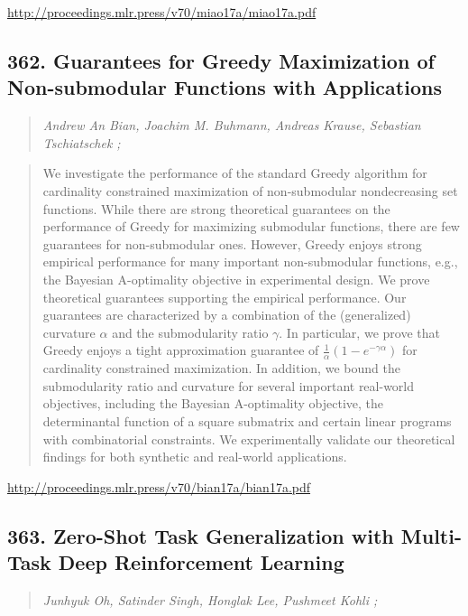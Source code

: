 \documentclass{article}
\begin{document}
\href{http://proceedings.mlr.press/v70/miao17a/miao17a.pdf}{http://proceedings.mlr.press/v70/miao17a/miao17a.pdf}

\subsection{362. Guarantees for Greedy Maximization of Non-submodular Functions with Applications}

\begin{quote}
\footnotesize{\textit{Andrew An Bian, Joachim M. Buhmann, Andreas Krause, Sebastian Tschiatschek ;}}
\end{quote}

\begin{quote}
    We investigate the performance of the standard Greedy algorithm for cardinality constrained maximization of non-submodular nondecreasing set functions. While there are strong theoretical guarantees on the performance of Greedy for maximizing submodular functions, there are few guarantees for non-submodular ones. However, Greedy enjoys strong empirical performance for many important non-submodular functions, e.g., the Bayesian A-optimality objective in experimental design. We prove theoretical guarantees supporting the empirical performance. Our guarantees are characterized by a combination of the (generalized) curvature $\alpha$ and the submodularity ratio $\gamma$. In particular, we prove that Greedy enjoys a tight approximation guarantee of $\frac{1}{\alpha}(1- e^{-\gamma\alpha})$ for cardinality constrained maximization. In addition, we bound the submodularity ratio and curvature for several important real-world objectives, including the Bayesian A-optimality objective, the determinantal function of a square submatrix and certain linear programs with combinatorial constraints. We experimentally validate our theoretical findings for both synthetic and real-world applications.  \end{quote}

\href{http://proceedings.mlr.press/v70/bian17a/bian17a.pdf}{http://proceedings.mlr.press/v70/bian17a/bian17a.pdf}

\subsection{363. Zero-Shot Task Generalization with Multi-Task Deep Reinforcement Learning}

\begin{quote}
\footnotesize{\textit{Junhyuk Oh, Satinder Singh, Honglak Lee, Pushmeet Kohli ;}}
\end{quote}
\end{document}
